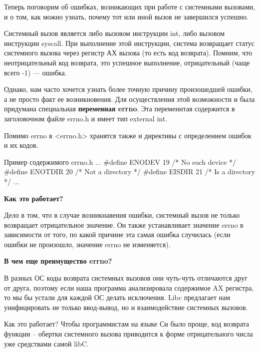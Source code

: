 Теперь поговорим об ошибках, возникающих при работе с системными вызовами, и о том, как можно узнать, почему тот или иной вызов не завершился успешно.

Системный вызов является либо вызовом инструкции int, либо вызовом инструкции syscall. При выполнение этой инструкции, система возвращает статус системного вызова через регистр АХ вызова (то есть код возврата). Помним, что неотрицательный код возврата, это успешное выполнение, отрицательный (чаще всего -1) --- ошибка. 

Однако, нам часто хочется узнать более точную причину произошедшей ошибки, а не просто факт ее возникновения. Для осуществления этой возможности и была придумана специальная \textbf{переменная errno}. Эта переменнтая содержится в заголовочном файле errno.h и имеет тип external int.

Помимо errno в <errno.h> хранятся также и директивы с определением ошибок и их кодов.


\begin{CCode}{Пример содержимого errno.h}
	...
	#define ENODEV      19  /* No such device */
	#define ENOTDIR     20  /* Not a directory */
	#define EISDIR      21  /* Is a directory */ 
	... \end{CCode}

\textbf{Как это работает?}

Дело в том, что в случае возникнавения ошибки, системный вызов не только возвращает отрицательное значение. Он также устанавливает значение errno в зависимости от того, по какой причине эта самая ошибка случилась (если ошибки не произошло, значение errno не изменяется). 

\textbf{В чем еще преимущество errno?}

В разных ОС коды возврата системных вызовов они чуть-чуть отличаются друг от друга, поэтому если наша программа анализировала содержимое AX регистра, то мы бы устали для каждой ОС делать исключения. Libc предлагает нам унифицировать не только ввод-вывод, но и взаимодействие системных вызовов. 

Как это работает? Чтобы программистам на языке Си было проще, код возврата функции -- обертки системного вызова приводится к форме отрицательного числа уже средствами самой libC. 
